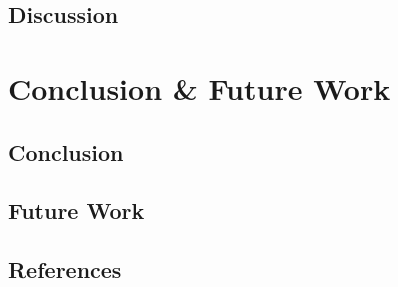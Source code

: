 \documentclass{article}
\begin{document}
\subsection{Discussion}

\section{Conclusion {\&} Future Work}

\subsection{Conclusion}
\subsection{Future Work}

\subsection{References}
\begingroup
\renewcommand{\bibname}{} 
 
 
\endgroup
\end{document}
